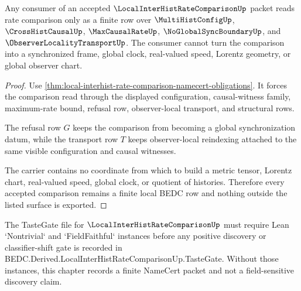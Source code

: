 \begin{theorem}
\label{thm:local-interhist-rate-comparison-no-frame-boundary}
Any consumer of an accepted $\LocalInterHistRateComparisonUp$ packet reads rate comparison only as a finite row over $\MultiHistConfigUp$, $\CrossHistCausalUp$, $\MaxCausalRateUp$, $\NoGlobalSyncBoundaryUp$, and $\ObserverLocalityTransportUp$. The consumer cannot turn the comparison into a synchronized frame, global clock, real-valued speed, Lorentz geometry, or global observer chart.
\end{theorem}
\begin{proof}
Use \autoref{thm:local-interhist-rate-comparison-namecert-obligations}. It forces the comparison read through the displayed configuration, causal-witness family, maximum-rate bound, refusal row, observer-local transport, and structural rows.

The refusal row $G$ keeps the comparison from becoming a global synchronization datum, while the transport row $T$ keeps observer-local reindexing attached to the same visible configuration and causal witnesses.

The carrier contains no coordinate from which to build a metric tensor, Lorentz chart, real-valued speed, global clock, or quotient of histories. Therefore every accepted comparison remains a finite local BEDC row and nothing outside the listed surface is exported.
\end{proof}



The TasteGate file for $\LocalInterHistRateComparisonUp$ must require Lean `Nontrivial` and `FieldFaithful` instances before any positive discovery or classifier-shift gate is recorded in BEDC.Derived.LocalInterHistRateComparisonUp.TasteGate. Without those instances, this chapter records a finite NameCert packet and not a field-sensitive discovery claim.

